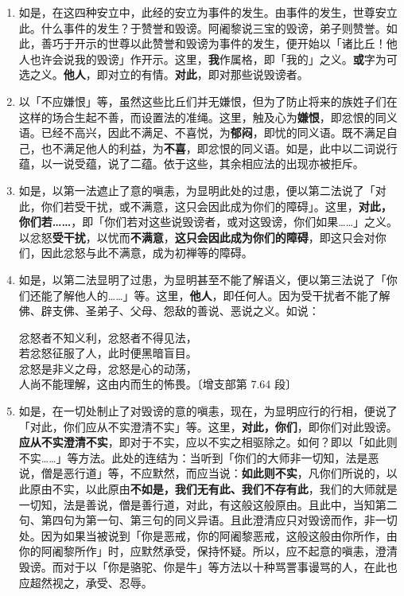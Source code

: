 \begin{enumerate}
\item 如是，在这四种安立中，此经的安立为事件的发生。由事件的发生，世尊安立此。什么事件的发生？于赞誉和毁谤。阿阇黎说三宝的毁谤，弟子则赞誉。如此，善巧于开示的世尊以此赞誉和毁谤为事件的发生，便开始以「诸比丘！他人也许会说我的毁谤」作开示。这里，\textbf{我}作属格，即「我的」之义。\textbf{或}字为可选之义。\textbf{他人}，即对立的有情。\textbf{对此}，即对那些说毁谤者。
\item 以「不应嫌恨」等，虽然这些比丘们并无嫌恨，但为了防止将来的族姓子们在这样的场合生起不善，而设置法的准绳。这里，触及心为\textbf{嫌恨}，即忿恨的同义语。已经不高兴，因此不满足、不喜悦，为\textbf{郁闷}，即忧的同义语。既不满足自己，也不满足他人的利益，为\textbf{不喜}，即忿恨的同义语。如是，此中以二词说行蕴，以一说受蕴，说了二蕴。依于这些，其余相应法的出现亦被拒斥。
\item 如是，以第一法遮止了意的嗔恚，为显明此处的过患，便以第二法说了「对此，你们若受干扰，或不满意，这只会因此成为你们的障碍」。这里，\textbf{对此，你们若……}，即「你们若对这些说毁谤者，或对这毁谤，你们如果……」之义。以忿怒\textbf{受干扰}，以忧而\textbf{不满意}，\textbf{这只会因此成为你们的障碍}，即这只会对你们，因此忿怒与此不满意，成为初禅等的障碍。
\item 如是，以第二法显明了过患，为显明甚至不能了解语义，便以第三法说了「你们还能了解他人的……」等。这里，\textbf{他人}，即任何人。因为受干扰者不能了解佛、辟支佛、圣弟子、父母、怨敌的善说、恶说之义。如说：\begin{quoting}忿怒者不知义利，忿怒者不得见法，\\若忿怒征服了人，此时便黑暗盲目。\\忿怒是非义之母，忿怒是心的动荡，\\人尚不能理解，这由内而生的怖畏。{\bluefootnotesize 〔增支部第 7.64 段〕}\end{quoting}
\item 如是，在一切处制止了对毁谤的意的嗔恚，现在，为显明应行的行相，便说了「对此，你们应从不实澄清不实」等。这里，\textbf{对此，你们}，即你们对此毁谤。\textbf{应从不实澄清不实}，即对于不实，应以不实之相驱除之。如何？即以「如此则不实……」等方法。此处的连结为：当听到「你们的大师非一切知，法是恶说，僧是恶行道」等，不应默然，而应当说：\textbf{如此则不实}，凡你们所说的，以此原由不实，以此原由\textbf{不如是，我们无有此、我们不存有此}，我们的大师就是一切知，法是善说，僧是善行道，对此，有这般这般原由。且此中，当知第二句、第四句为第一句、第三句的同义异语。且此澄清应只对毁谤而作，非一切处。因为如果当被说到「你是恶戒，你的阿阇黎恶戒，这般这般由你所作，由你的阿阇黎所作」时，应默然承受，保持怀疑。所以，应不起意的嗔恚，澄清毁谤。而对于以「你是骆驼、你是牛」等方法以十种骂詈事谩骂的人，在此也应超然视之，承受、忍辱。\end{enumerate}

